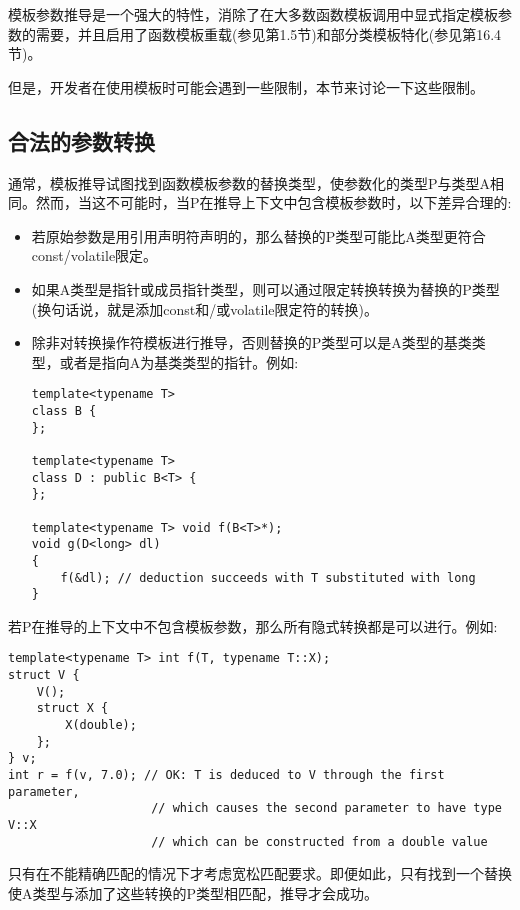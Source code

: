 

模板参数推导是一个强大的特性，消除了在大多数函数模板调用中显式指定模板参数的需要，并且启用了函数模板重载(参见第1.5节)和部分类模板特化(参见第16.4节)。

但是，开发者在使用模板时可能会遇到一些限制，本节来讨论一下这些限制。

\subsection{合法的参数转换}

通常，模板推导试图找到函数模板参数的替换类型，使参数化的类型P与类型A相同。然而，当这不可能时，当P在推导上下文中包含模板参数时，以下差异合理的:

\begin{itemize}
\item 
若原始参数是用引用声明符声明的，那么替换的P类型可能比A类型更符合const/volatile限定。

\item 
如果A类型是指针或成员指针类型，则可以通过限定转换转换为替换的P类型(换句话说，就是添加const和/或volatile限定符的转换)。

\item 
除非对转换操作符模板进行推导，否则替换的P类型可以是A类型的基类类型，或者是指向A为基类类型的指针。例如:

\begin{lstlisting}[style=styleCXX]
template<typename T>
class B {
};

template<typename T>
class D : public B<T> {
};

template<typename T> void f(B<T>*);
void g(D<long> dl)
{
	f(&dl); // deduction succeeds with T substituted with long
}
\end{lstlisting}
\end{itemize}

若P在推导的上下文中不包含模板参数，那么所有隐式转换都是可以进行。例如:

\begin{lstlisting}[style=styleCXX]
template<typename T> int f(T, typename T::X);
struct V {
	V();
	struct X {
		X(double);
	};
} v;
int r = f(v, 7.0); // OK: T is deduced to V through the first parameter,
					// which causes the second parameter to have type V::X
					// which can be constructed from a double value
\end{lstlisting}

只有在不能精确匹配的情况下才考虑宽松匹配要求。即便如此，只有找到一个替换使A类型与添加了这些转换的P类型相匹配，推导才会成功。


